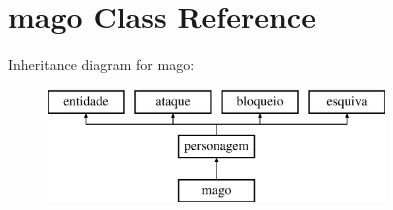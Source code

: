 \hypertarget{classmago}{}\section{mago Class Reference}
\label{classmago}
Inheritance diagram for mago\+:\begin{figure}[H]
\begin{center}
\leavevmode
\includegraphics[height=3.000000cm]{classmago}
\end{center}
\end{figure}
